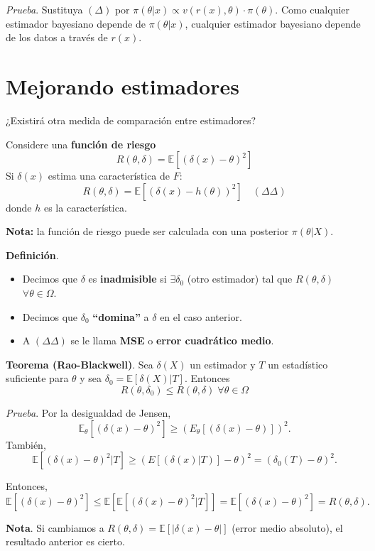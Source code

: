 \documentclass[
  12pt,
]{book}
\begin{document}
\emph{Prueba}. Sustituya \((\Delta)\) por \(\pi(\theta|x) \propto v(r(x),\theta)\cdot\pi(\theta)\). Como cualquier estimador bayesiano depende de \(\pi(\theta|x)\), cualquier estimador bayesiano depende de los datos a través de \(r(x)\).

\hypertarget{mejorando-estimadores}{%
\section{Mejorando estimadores}\label{mejorando-estimadores}}

¿Existirá otra medida de comparación entre estimadores?

Considere una \textbf{función de riesgo}
\[ R(\theta,\delta) = \mathbb E[(\delta(x)-\theta) ^2]\]
Si \(\delta(x)\) estima una característica de \(F\):
\[ R(\theta,\delta) = \mathbb E[(\delta(x)-h(\theta))^2]\quad (\Delta\Delta)\]
donde \(h\) es la característica.

\textbf{Nota:} la función de riesgo puede ser calculada con una posterior \(\pi(\theta|X)\).

\textbf{Definición}.

\begin{itemize}
\item
  Decimos que \(\delta\) es \textbf{inadmisible} si \(\exists \delta_0\) (otro estimador) tal que \(R(\theta,\delta)\) \(\forall \theta \in \Omega\).
\item
  Decimos que \(\delta_0\) \textbf{``domina''} a \(\delta\) en el caso anterior.
\item
  A \((\Delta \Delta)\) se le llama \textbf{MSE} o \textbf{error cuadrático medio}.
\end{itemize}

\textbf{Teorema (Rao-Blackwell)}. Sea \(\delta(X)\) un estimador y \(T\) un estadístico suficiente para \(\theta\) y sea \(\delta_0 = \mathbb E[\delta(X)|T]\). Entonces
\[ R(\theta,\delta_0) \leq R(\theta,\delta) \; \forall \theta \in \Omega\]

\emph{Prueba}. Por la desigualdad de Jensen,
\[ \mathbb E_\theta[(\delta(x)-\theta)^2] \geq (E_\theta[(\delta(x)-\theta)])^2. \]
También,
\[\mathbb E[(\delta(x)-\theta)^2|T] \geq (E[(\delta(x)|T)]-\theta)^2 = (\delta_0(T)-\theta)^2.\]

Entonces,
\[ \mathbb E[(\delta(x)-\theta)^2] \leq \mathbb E[\mathbb E[(\delta(x)-\theta)^2|T]] = \mathbb E[(\delta(x)-\theta)^2] = R(\theta,\delta).\]

\textbf{Nota}. Si cambiamos a \(R(\theta,\delta) = \mathbb E[|\delta(x)-\theta|]\) (error medio absoluto), el resultado anterior es cierto.
\end{document}
